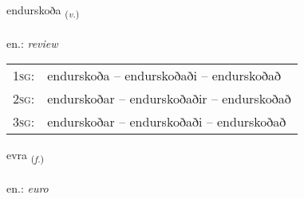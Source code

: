 \documentclass[frontgrid, backgrid]{flacards}\usepackage[]{graphicx}\usepackage[]{xcolor}
\begin{document}
\renewcommand{\blhead}{\vskip5pt {\small\bfseries\footnotesize Sagnorð | Verb }}
\renewcommand{\bcfoot}{\vskip5pt \hspace{2pt}{\small\bfseries\footnotesize 2K}}


{endurskoða \small{\textsubscript{(\textit{v.})}} \\[1ex] %
 \\
en.: \emph{review} \\  [2ex]
\renewcommand*{\arraystretch}{0.8}
\begin{tabular}{p{1cm}l}
\textsc{1sg}: & endurskoða -- endurskoðaði -- endurskoðað \\ 
\textsc{2sg}: & endurskoðar -- endurskoðaðir -- endurskoðað \\ 
\textsc{3sg}: & endurskoðar -- endurskoðaði -- endurskoðað \\ 
\end{tabular}
}

\renewcommand{\flhead}{\vskip5pt \fboxsep=0pt {\small\bfseries\footnotesize Nafnorð | Noun}}
\renewcommand{\fcfoot}{\vskip5pt \fboxsep=0pt \hspace{2pt}{\small\bfseries\footnotesize 2K}}

\renewcommand{\blhead}{\vskip5pt {\small\bfseries\footnotesize Nafnorð | Noun }}
\renewcommand{\bcfoot}{\vskip5pt \hspace{2pt}{\small\bfseries\footnotesize 2K}}


{evra \small{\textsubscript{(\textit{f.})}} \\[1ex] %
\textphonetic{[ɛvra]} \\
en.: \emph{euro} \\  [2ex]
\renewcommand*{\arraystretch}{0.8}
}
\end{document}
